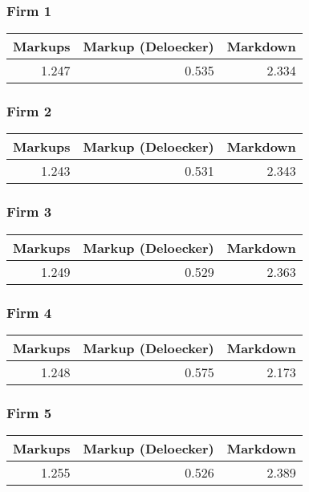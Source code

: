 \subsubsection*{Firm 1}
\begin{tabular}{rrr}
\toprule
 Markups &  Markup (Deloecker) &  Markdown \\
\midrule
   1.247 &               0.535 &     2.334 \\
\bottomrule
\end{tabular}


\subsubsection*{Firm 2}
\begin{tabular}{rrr}
\toprule
 Markups &  Markup (Deloecker) &  Markdown \\
\midrule
   1.243 &               0.531 &     2.343 \\
\bottomrule
\end{tabular}


\subsubsection*{Firm 3}
\begin{tabular}{rrr}
\toprule
 Markups &  Markup (Deloecker) &  Markdown \\
\midrule
   1.249 &               0.529 &     2.363 \\
\bottomrule
\end{tabular}


\subsubsection*{Firm 4}
\begin{tabular}{rrr}
\toprule
 Markups &  Markup (Deloecker) &  Markdown \\
\midrule
   1.248 &               0.575 &     2.173 \\
\bottomrule
\end{tabular}


\subsubsection*{Firm 5}
\begin{tabular}{rrr}
\toprule
 Markups &  Markup (Deloecker) &  Markdown \\
\midrule
   1.255 &               0.526 &     2.389 \\
\bottomrule
\end{tabular}


